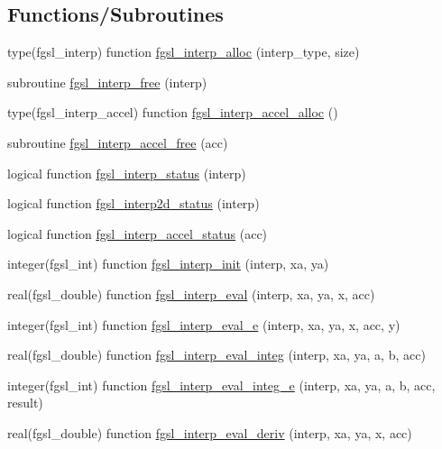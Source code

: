 \subsection*{Functions/\+Subroutines}
\begin{DoxyCompactItemize}
\item 
type(fgsl\+\_\+interp) function \hyperlink{interp_8finc_a85d81be60660a84879e2148724d250cc}{fgsl\+\_\+interp\+\_\+alloc} (interp\+\_\+type, size)
\item 
subroutine \hyperlink{interp_8finc_a3cec445cbc603ff9045fc6eb5b2aee36}{fgsl\+\_\+interp\+\_\+free} (interp)
\item 
type(fgsl\+\_\+interp\+\_\+accel) function \hyperlink{interp_8finc_a8ef030df058aadca9f34d486136f1a2a}{fgsl\+\_\+interp\+\_\+accel\+\_\+alloc} ()
\item 
subroutine \hyperlink{interp_8finc_a943a42ee8c354909f417bdd5d3e51425}{fgsl\+\_\+interp\+\_\+accel\+\_\+free} (acc)
\item 
logical function \hyperlink{interp_8finc_ae7b75708ca1cabe167d868cd155713d4}{fgsl\+\_\+interp\+\_\+status} (interp)
\item 
logical function \hyperlink{interp_8finc_a408cdc8fc01401556a0324d1341495c4}{fgsl\+\_\+interp2d\+\_\+status} (interp)
\item 
logical function \hyperlink{interp_8finc_ae1478c665d9d001580eb90c855b6288d}{fgsl\+\_\+interp\+\_\+accel\+\_\+status} (acc)
\item 
integer(fgsl\+\_\+int) function \hyperlink{interp_8finc_a0a0fbdef7ef91999fde2192cd5355d59}{fgsl\+\_\+interp\+\_\+init} (interp, xa, ya)
\item 
real(fgsl\+\_\+double) function \hyperlink{interp_8finc_a95909e5a34b271d917d35fdb5f1168f0}{fgsl\+\_\+interp\+\_\+eval} (interp, xa, ya, x, acc)
\item 
integer(fgsl\+\_\+int) function \hyperlink{interp_8finc_a1439d29134b2c5dbaa2b091f925c3dca}{fgsl\+\_\+interp\+\_\+eval\+\_\+e} (interp, xa, ya, x, acc, y)
\item 
real(fgsl\+\_\+double) function \hyperlink{interp_8finc_a51d1986524d01be2a3f9e24ddaccadf5}{fgsl\+\_\+interp\+\_\+eval\+\_\+integ} (interp, xa, ya, a, b, acc)
\item 
integer(fgsl\+\_\+int) function \hyperlink{interp_8finc_a1aa6af97dc477f8439664601e8aa231a}{fgsl\+\_\+interp\+\_\+eval\+\_\+integ\+\_\+e} (interp, xa, ya, a, b, acc, result)
\item 
real(fgsl\+\_\+double) function \hyperlink{interp_8finc_ac57b89652d8434b0ed0c0757e1b408a3}{fgsl\+\_\+interp\+\_\+eval\+\_\+deriv} (interp, xa, ya, x, acc)

\end{DoxyCompactItemize}
